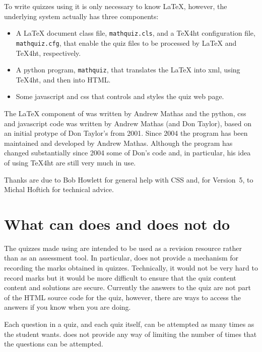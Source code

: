 \documentclass[svgnames]{article}
\begin{document}
    To write quizzes using \MathQuiz it is only necessary to know
    \LaTeX, however, the underlying \MathQuiz system actually has three components:
    \begin{itemize}
      \item A \LaTeX{} document class file, \texttt{mathquiz.cls}, and
      a \TeX 4ht configuration file, \texttt{mathquiz.cfg}, that enable the
      quiz files to be processed by \LaTeX{} and \TeX 4ht, respectively.
      \item A python program, \texttt{mathquiz}, that translates the
      \LaTeX{} into xml, using \TeX 4ht, and then into HTML.
      \item Some javascript and css that controls and styles the quiz web page.
    \end{itemize}

   The \LaTeX{} component of \MathQuiz{} was written by Andrew Mathas
   and the python, css and javascript code was written by Andrew Mathas
   (and Don Taylor), based on an initial protype of Don Taylor's from
   2001.  Since 2004 the program has been maintained and developed by
   Andrew Mathas. Although the program has changed substantially since
   2004 some of Don's code and, in particular, his idea of using
   \TeX 4ht are still very much in use.

   Thanks are due to Bob Howlett for general help with CSS and, for
   Version~5, to  Michal Hoftich for technical advice.

  \section{What can \MathQuiz does and does not do}

    The quizzes made using \MathQuiz are intended to be used as a
    revision resource rather than as an assessment tool. In particular,
    \MathQuiz does not provide a mechanism for recording the marks
    obtained in quizzes. Technically, it would not be very hard to record marks
    but it would be more difficult to ensure that the quiz content
    content and solutions are secure. Currently the answers to the quiz
    are not part of the HTML source code for the quiz, however, there
    are ways to access the answers if you know when you are doing.

    Each question in a quiz, and each quiz itself, can be attempted as
    many times as the student wants. \MathQuiz does not provide any way
    of limiting the number of times that the questions can be attempted.
\end{document}
